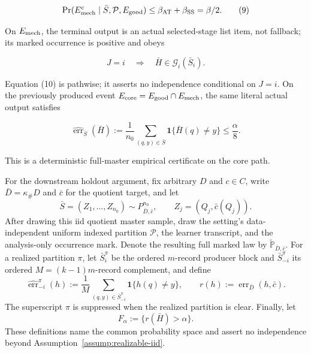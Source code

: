 \begin{proposition}
\[
 \Pr(E_{\rm mech}^c\mid\bar S,\mathcal P,E_{\rm good})
 \leq\beta_{\rm AT}+\beta_{\rm SS}=\beta/2.
 \tag{9}
\]

On \(E_{\rm mech}\), the terminal output is an actual selected-stage list
item, not fallback; its  marked occurrence is positive and obeys

\[
 J=i\quad\Longrightarrow\quad
 \bar H\in\mathcal G_i(\bar S_i).
 \tag{10}
\]

Equation (10) is pathwise; it asserts no independence conditional on
\(J=i\). On the previously produced event
\(E_{\rm core}=E_{\rm good}\cap E_{\rm mech}\), the same literal actual
output satisfies

\[
 \widehat{\operatorname{err}}_{\bar S}(\bar H)
 :=\frac1{n_0}\sum_{(q,y)\in\bar S}
       \mathbf1\{\bar H(q)\ne y\}
 \leq\frac{\alpha}{8}.
 \tag{12}
\]

This is a deterministic full-master empirical certificate on the core path.

For the downstream holdout argument, fix arbitrary \(D\) and \(c\in C\),
write \(\bar D=\kappa_\#D\) and \(\bar c\) for the quotient target, and let
\[
 \bar S=(Z_1,\ldots,Z_{n_0})
 \sim P_{\bar D,\bar c}^{n_0},
 \qquad Z_j=(Q_j,\bar c(Q_j)).
 \tag{13}
\]
After drawing this iid quotient master sample, draw the setting's
data-independent uniform indexed partition \(\mathcal P\), the learner
transcript, and the analysis-only occurrence mark. Denote the resulting full
marked law by \(\widetilde{\mathbb P}_{\bar D,\bar c}\). For a realized
partition \(\pi\), let \(\bar S_i^\pi\) be the ordered \(m\)-record producer
block and \(\bar S_{-i}^\pi\) its ordered
\(M=(k-1)m\)-record complement, and define
\[
 \widehat{\operatorname{err}}_{-i}^\pi(h)
 :=\frac1M\sum_{(q,y)\in\bar S_{-i}^\pi}
       \mathbf1\{h(q)\ne y\},
 \qquad
 r(h):=\operatorname{err}_{\bar D}(h,\bar c).
 \tag{14}
\]
The superscript \(\pi\) is suppressed when the realized partition is clear.
Finally, let
\[
 F_\alpha:=\{r(\bar H)>\alpha\}.
 \tag{15}
\]
These definitions name the common probability space and assert no
independence beyond Assumption~\ref{assump:realizable-iid}.
\end{proposition}

